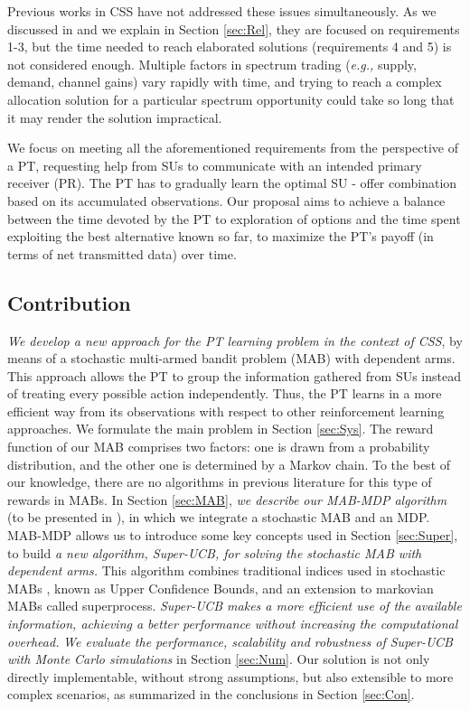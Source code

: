 Previous works in CSS have not addressed these issues simultaneously. As we discussed in \cite{ref:Mario2014} and we explain in Section \ref{sec:Rel}, they are focused on requirements 1-3, but the time needed to reach elaborated solutions (requirements 4 and 5) is not considered enough. 
Multiple factors in spectrum trading (\textit{e.g.,} supply, demand, channel gains) vary rapidly with time, and trying to reach a complex allocation solution for a particular spectrum opportunity could take so long that it may render the solution impractical.

We focus on meeting all the aforementioned requirements from the perspective of a PT, requesting help from SUs to communicate with an intended primary receiver (PR). The PT has to gradually learn the optimal SU - offer combination based on its accumulated observations. Our proposal aims to achieve a balance between the time devoted by the PT to exploration of options and the time spent exploiting the best alternative known so far, to maximize the PT's payoff (in terms of net transmitted data) over time.

\subsection{Contribution}

\textit{We develop a new approach for the PT learning problem in the context of CSS}, by means of a stochastic multi-armed bandit problem (MAB) with dependent arms. This approach allows the PT to group the information gathered from SUs instead of treating every possible action independently. Thus, the PT learns in a more efficient way from its observations with respect to other reinforcement learning approaches. We formulate the main problem in Section \ref{sec:Sys}.
The reward function of our MAB comprises two factors: one is drawn from a probability distribution, and the other one is determined by a Markov chain.
To the best of our knowledge, there are no algorithms in previous literature for this type of rewards in MABs. 
In Section \ref{sec:MAB}, \textit{we describe our MAB-MDP algorithm} (to be presented in \cite{ref:Mario2015}), in which we integrate a stochastic MAB and an MDP. MAB-MDP allows us to introduce some key concepts used in Section \ref{sec:Super}, to build \textit{a new algorithm, Super-UCB, for solving the stochastic MAB with dependent arms.} This algorithm combines traditional indices used in stochastic MABs \cite{ref:Auer2002}, known as Upper Confidence Bounds, and an extension to markovian MABs \cite{ref:Gittins2011} called superprocess. \textit{Super-UCB makes a more efficient use of the available information, achieving a better performance without increasing the computational overhead.} \textit{We evaluate the performance, scalability and robustness of Super-UCB with Monte Carlo simulations} in Section \ref{sec:Num}.
Our solution is not only directly implementable, without strong assumptions, but also extensible to more complex scenarios, as summarized in the conclusions in Section \ref{sec:Con}.

